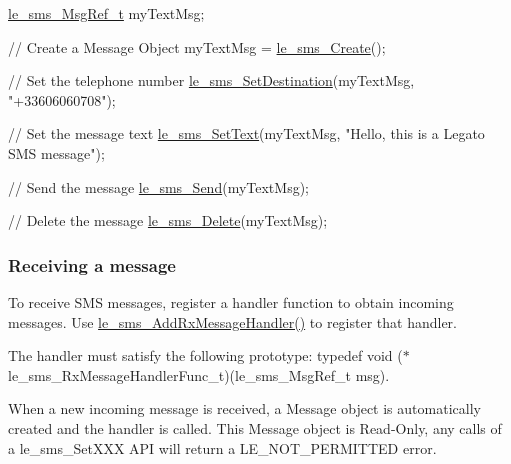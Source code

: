 \begin{DoxyCode}
[...]

\hyperlink{le__sms__interface_8h_a8eb2a15362fe26516fc68fd7a7d5e3e7}{le\_sms\_MsgRef\_t} myTextMsg;

\textcolor{comment}{// Create a Message Object}
myTextMsg = \hyperlink{le__sms__interface_8h_a668abcbcff2f1f3c5cdf799315a81058}{le\_sms\_Create}();

\textcolor{comment}{// Set the telephone number}
\hyperlink{le__sms__interface_8h_a145d3215f5601b88ef80b2674a9df226}{le\_sms\_SetDestination}(myTextMsg, \textcolor{stringliteral}{"+33606060708"});

\textcolor{comment}{// Set the message text}
\hyperlink{le__sms__interface_8h_a34dc999430c46530d6c9067f800c5d72}{le\_sms\_SetText}(myTextMsg, \textcolor{stringliteral}{"Hello, this is a Legato SMS message"});

\textcolor{comment}{// Send the message}
\hyperlink{le__sms__interface_8h_ab7dee7d2c74cfcadd9ea0d5fe1786dfc}{le\_sms\_Send}(myTextMsg);

\textcolor{comment}{// Delete the message}
\hyperlink{le__sms__interface_8h_aca1691010c88995cb47225f2889910fa}{le\_sms\_Delete}(myTextMsg);
\end{DoxyCode}
\hypertarget{c_sms_le_sms_ops_receiving}{}\subsubsection{Receiving a message}\label{c_sms_le_sms_ops_receiving}
To receive S\+M\+S messages, register a handler function to obtain incoming messages. Use {\ttfamily \hyperlink{le__sms__interface_8h_a844d595f3ae8d170b2fff80d854abb8d}{le\+\_\+sms\+\_\+\+Add\+Rx\+Message\+Handler()}} to register that handler.

The handler must satisfy the following prototype\+: {\ttfamily typedef} void ($\ast$le\+\_\+sms\+\_\+\+Rx\+Message\+Handler\+Func\+\_\+t)(le\+\_\+sms\+\_\+\+Msg\+Ref\+\_\+t msg).

When a new incoming message is received, a Message object is automatically created and the handler is called. This Message object is Read-\/\+Only, any calls of a le\+\_\+sms\+\_\+\+Set\+X\+X\+X A\+P\+I will return a L\+E\+\_\+\+N\+O\+T\+\_\+\+P\+E\+R\+M\+I\+T\+T\+E\+D error.


